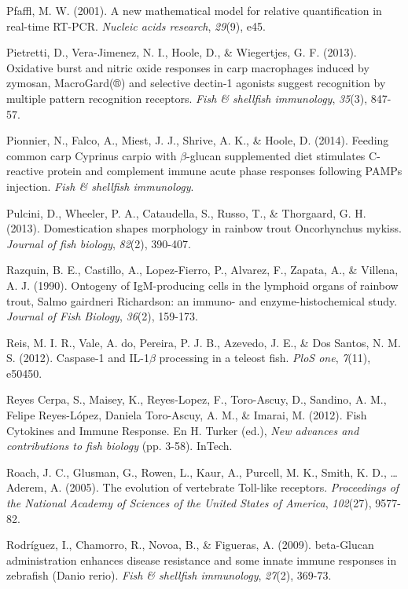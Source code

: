 \documentclass[12pt,letterpaper,oneside]{scrbook}
\begin{document}
Pfaffl, M. W. (2001). A new mathematical model for relative
quantification in real-time RT-PCR. \emph{Nucleic acids research},
\emph{29}(9), e45.

Pietretti, D., Vera-Jimenez, N. I., Hoole, D., \& Wiegertjes, G. F.
(2013). Oxidative burst and nitric oxide responses in carp macrophages
induced by zymosan, MacroGard(®) and selective dectin-1 agonists suggest
recognition by multiple pattern recognition receptors. \emph{Fish \&
shellfish immunology}, \emph{35}(3), 847-57.

Pionnier, N., Falco, A., Miest, J. J., Shrive, A. K., \& Hoole, D.
(2014). Feeding common carp Cyprinus carpio with \(\beta\)-glucan
supplemented diet stimulates C-reactive protein and complement immune
acute phase responses following PAMPs injection. \emph{Fish \& shellfish
immunology}.

Pulcini, D., Wheeler, P. A., Cataudella, S., Russo, T., \& Thorgaard, G.
H. (2013). Domestication shapes morphology in rainbow trout Oncorhynchus
mykiss. \emph{Journal of fish biology}, \emph{82}(2), 390-407.

Razquin, B. E., Castillo, A., Lopez-Fierro, P., Alvarez, F., Zapata, A.,
\& Villena, A. J. (1990). Ontogeny of IgM-producing cells in the
lymphoid organs of rainbow trout, Salmo gairdneri Richardson: an immuno-
and enzyme-histochemical study. \emph{Journal of Fish Biology},
\emph{36}(2), 159-173.

Reis, M. I. R., Vale, A. do, Pereira, P. J. B., Azevedo, J. E., \& {Dos
Santos}, N. M. S. (2012). Caspase-1 and IL-1\(\beta\) processing in a
teleost fish. \emph{PloS one}, \emph{7}(11), e50450.

{Reyes Cerpa}, S., Maisey, K., Reyes-Lopez, F., Toro-Ascuy, D., Sandino,
A. M., {Felipe Reyes-López, Daniela Toro-Ascuy}, A. M., \& Imarai, M.
(2012). Fish Cytokines and Immune Response. En H. Turker (ed.),
\emph{New advances and contributions to fish biology} (pp. 3-58).
InTech.

Roach, J. C., Glusman, G., Rowen, L., Kaur, A., Purcell, M. K., Smith,
K. D., \ldots{} Aderem, A. (2005). The evolution of vertebrate Toll-like
receptors. \emph{Proceedings of the National Academy of Sciences of the
United States of America}, \emph{102}(27), 9577-82.

Rodríguez, I., Chamorro, R., Novoa, B., \& Figueras, A. (2009).
beta-Glucan administration enhances disease resistance and some innate
immune responses in zebrafish (Danio rerio). \emph{Fish \& shellfish
immunology}, \emph{27}(2), 369-73.
\end{document}
